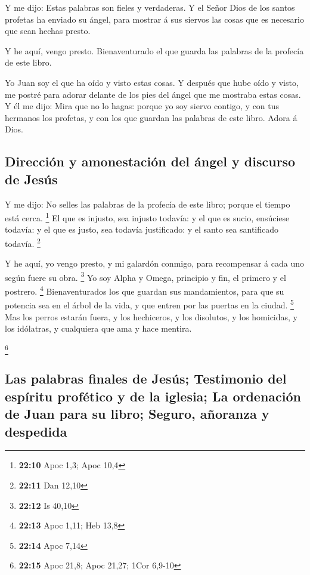  Y me dijo: Estas palabras son fieles y verdaderas. Y el
Señor Dios de los santos profetas ha enviado su ángel, para mostrar á
sus siervos las cosas que es necesario que sean hechas presto.

 Y he aquí, vengo presto. Bienaventurado el que guarda las
palabras de la profecía de este libro.

 Yo Juan soy el que ha oído y visto estas cosas. Y después
que hube oído y visto, me postré para adorar delante de los pies del
ángel que me mostraba estas cosas.  Y él me dijo: Mira que
no lo hagas: porque yo soy siervo contigo, y con tus hermanos los
profetas, y con los que guardan las palabras de este libro. Adora á
Dios.

\hypertarget{direcciuxf3n-y-amonestaciuxf3n-del-uxe1ngel-y-discurso-de-jesuxfas}{%
\subsection{Dirección y amonestación del ángel y discurso de
Jesús}\label{direcciuxf3n-y-amonestaciuxf3n-del-uxe1ngel-y-discurso-de-jesuxfas}}

 Y me dijo: No selles las palabras de la profecía de este
libro; porque el tiempo está cerca. \footnote{\textbf{22:10} Apoc 1,3;
  Apoc 10,4}  El que es injusto, sea injusto todavía: y el
que es sucio, ensúciese todavía: y el que es justo, sea todavía
justificado: y el santo sea santificado todavía. \footnote{\textbf{22:11}
  Dan 12,10}

 Y he aquí, yo vengo presto, y mi galardón conmigo, para
recompensar á cada uno según fuere su obra. \footnote{\textbf{22:12} Is
  40,10}  Yo soy Alpha y Omega, principio y fin, el primero
y el postrero. \footnote{\textbf{22:13} Apoc 1,11; Heb 13,8}
 Bienaventurados los que guardan sus mandamientos, para que
su potencia sea en el árbol de la vida, y que entren por las puertas en
la ciudad. \footnote{\textbf{22:14} Apoc 7,14}  Mas los
perros estarán fuera, y los hechiceros, y los disolutos, y los
homicidas, y los idólatras, y cualquiera que ama y hace mentira.

\footnote{\textbf{22:15} Apoc 21,8; Apoc 21,27; 1Cor 6,9-10}

\hypertarget{las-palabras-finales-de-jesuxfas-testimonio-del-espuxedritu-profuxe9tico-y-de-la-iglesia-la-ordenaciuxf3n-de-juan-para-su-libro-seguro-auxf1oranza-y-despedida}{%
\subsection{Las palabras finales de Jesús; Testimonio del espíritu
profético y de la iglesia; La ordenación de Juan para su libro; Seguro,
añoranza y
despedida}\label{las-palabras-finales-de-jesuxfas-testimonio-del-espuxedritu-profuxe9tico-y-de-la-iglesia-la-ordenaciuxf3n-de-juan-para-su-libro-seguro-auxf1oranza-y-despedida}}

